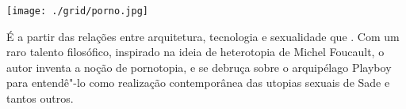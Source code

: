 %
%
%
%
%
%

\pagebreak


\begin{center}
\hspace*{.5cm}\texttt{[image: ./grid/porno.jpg]}
\end{center}

\hspace*{-7cm}\hrulefill\hspace*{-7cm}

\medskip

\noindent{}É a partir das relações entre arquitetura, tecnologia e sexualidade que . Com um raro talento filosófico, inspirado na ideia de heterotopia de Michel Foucault, o autor inventa a noção de pornotopia, e se debruça sobre o arquipélago Playboy para entendê"-lo como realização contemporânea das utopias sexuais de Sade e tantos outros.


